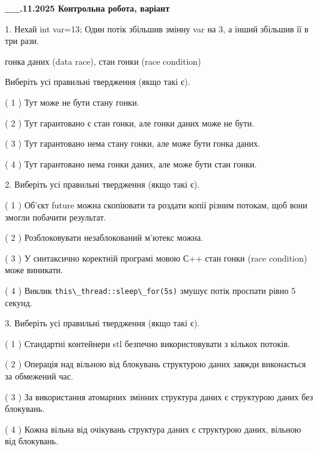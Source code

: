 \documentclass[12pt, ukrainian]{article}
\def\code#1{\Verb!#1!}
\begin{document}
\newpage
\begin {large}

\textbf{\_\_.11.2025 Контрольна робота, варіант  }\par


{
1. Нехай int var=13; Один потік збільшив змінну var на 3, а інший збільшив її в три рази.

гонка даних (data race), стан гонки (race condition)

Виберіть усі правильні твердження (якщо такі є).\par
\vspace{2mm}
( 1 ) Тут може не бути стану гонки.%

( 2 ) Тут гарантовано є стан гонки, але гонки даних може не бути.%

( 3 ) Тут гарантовано нема стану гонки, але може бути гонка даних.%

( 4 ) Тут гарантовано нема гонки даних, але може бути стан гонки.%


2. Виберіть усі правильні твердження (якщо такі є).\par
\vspace{2mm}

( 1 ) Об’єкт future можна скопіювати та роздати копії різним потокам, щоб вони змогли побачити результат.%

( 2 ) Розблоковувати незаблокований м’ютекс можна.%

( 3 ) У синтаксично коректній програмі мовою С++ стан гонки (race condition) може виникати.%

( 4 ) Виклик \code{this\_thread::sleep\_for(5s)} змушує потік проспати рівно 5 секунд.%


3. Виберіть усі правильні твердження (якщо такі є).\par
\vspace{2mm}

( 1 ) Стандартні контейнери stl безпечно використовувати з кількох потоків.%

( 2 ) Операція над вільною від блокувань структурою даних завжди виконається за обмежений час.%

( 3 ) За використання атомарних змінних структура даних є структурою даних без блокувань.%

( 4 ) Кожна вільна від очікувань структура даних є структурою даних, вільною від блокувань.%


}
\end{large}
\end{document}

